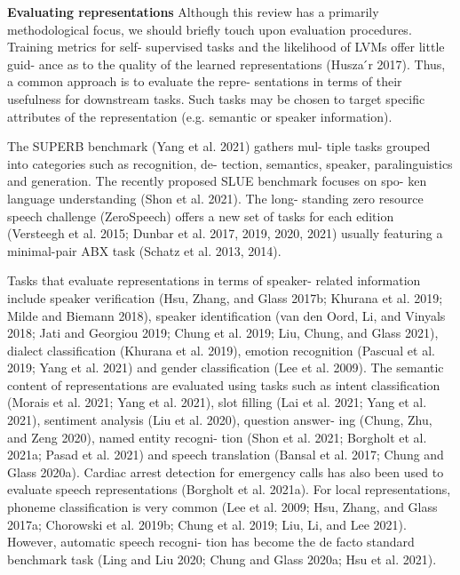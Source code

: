 \textbf{Evaluating representations} Although this review has a primarily methodological focus, we should briefly touch upon evaluation procedures. Training metrics for self- supervised tasks and the likelihood of LVMs offer little guid- ance as to the quality of the learned representations (Husza ́r 2017). Thus, a common approach is to evaluate the repre- sentations in terms of their usefulness for downstream tasks. Such tasks may be chosen to target specific attributes of the representation (e.g. semantic or speaker information).

The SUPERB benchmark (Yang et al. 2021) gathers mul- tiple tasks grouped into categories such as recognition, de- tection, semantics, speaker, paralinguistics and generation. The recently proposed SLUE benchmark focuses on spo- ken language understanding (Shon et al. 2021). The long- standing zero resource speech challenge (ZeroSpeech) offers a new set of tasks for each edition (Versteegh et al. 2015; Dunbar et al. 2017, 2019, 2020, 2021) usually featuring a minimal-pair ABX task (Schatz et al. 2013, 2014).

Tasks that evaluate representations in terms of speaker- related information include speaker verification (Hsu, Zhang, and Glass 2017b; Khurana et al. 2019; Milde and Biemann 2018), speaker identification (van den Oord, Li, and Vinyals 2018; Jati and Georgiou 2019; Chung et al. 2019; Liu, Chung, and Glass 2021), dialect classification (Khurana et al. 2019), emotion recognition (Pascual et al. 2019; Yang et al. 2021) and gender classification (Lee et al. 2009). The semantic content of representations are evaluated using tasks such as intent classification (Morais et al. 2021; Yang et al. 2021), slot filling (Lai et al. 2021; Yang et al. 2021), sentiment analysis (Liu et al. 2020), question answer- ing (Chung, Zhu, and Zeng 2020), named entity recogni- tion (Shon et al. 2021; Borgholt et al. 2021a; Pasad et al. 2021) and speech translation (Bansal et al. 2017; Chung and Glass 2020a). Cardiac arrest detection for emergency calls has also been used to evaluate speech representations (Borgholt et al. 2021a). For local representations, phoneme classification is very common (Lee et al. 2009; Hsu, Zhang, and Glass 2017a; Chorowski et al. 2019b; Chung et al. 2019; Liu, Li, and Lee 2021). However, automatic speech recogni- tion has become the de facto standard benchmark task (Ling and Liu 2020; Chung and Glass 2020a; Hsu et al. 2021).

